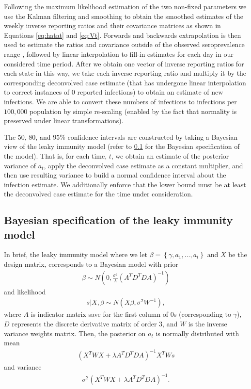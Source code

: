 \documentclass{article}
\begin{document}
Following the maximum likelihood estimation of the two non-fixed parameters
we use the Kalman filtering and smoothing to obtain the
smoothed estimates of the weekly inverse reporting ratios and
their covariance matrices as shown in Equations \ref{eq:hatat} and \ref{eq:Vt}.
Forwards and backwards extrapolation is then used to estimate the ratios and covariance
outside of the observed seroprevalence range \citep{durbin2012time}, followed by linear 
interpolation to fill-in estimates for each day in our considered time period. 
After we obtain one vector of inverse reporting ratios for each state in this
way, we take each inverse reporting ratio and multiply it by the corresponding
deconvolved case estimate (that has undergone linear interpolation to correct
instances of $0$ reported infections) to obtain an estimate of new infections.
We are able to convert these numbers of infections to
infections per $100,000$ population by simple re-scaling (enabled by the fact
that normality is preserved under linear transformations).

The $50$, $80$, and $95\%$ confidence intervals are constructed by taking a
Bayesian view of the leaky immunity model (refer to \ref{supp:bayesleaky} 
for the Bayesian specification of the model). 
That is, for each time, $t$, we obtain an estimate of the
posterior variance of $a_t$, apply the deconvolved case estimate as a constant
multiplier, and then use resulting variance to build a normal confidence
interval about the infection estimate. We additionally enforce that the lower
bound must be at least the deconvolved case estimate for the time under consideration.


\subsection{Bayesian specification of the leaky immunity
model}\label{supp:bayesleaky} 
In brief, the leaky immunity model where we let
$\beta = \left \{  \gamma, a_1,\dots, a_t \right \}$ and $X$ be the design
matrix, corresponds to a Bayesian model with prior 
\begin{align*}
    \beta \sim N \left( 0,  \frac{\sigma^2 }{ \lambda} \left( A^TD^TDA 
    \right)^{-1}  \right)
\end{align*} and likelihood 
\begin{align*}
    s|X,\beta \sim N \left( X\beta, \sigma^2W^{-1} \right),
\end{align*} where $A$ is indicator matrix save for the first column of $0$s 
(corresponding to $\gamma$), $D$ represents the discrete derivative matrix of 
order $3$, and $W$ is the inverse variance weights matrix. Then, the posterior 
on $a_t$ is normally distributed with mean 
\begin{align*}
    \left ( X^TWX + \lambda A^TD^TDA \right )^{-1}X^TWs
\end{align*} 
and variance 
\begin{align*}
    \sigma^2 (X^TWX + \lambda A^TD^TDA)^{-1}.
\end{align*}
\end{document}
